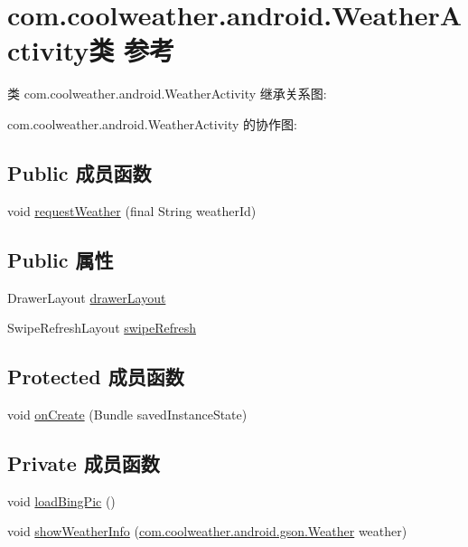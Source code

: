 \hypertarget{classcom_1_1coolweather_1_1android_1_1_weather_activity}{}\section{com.\+coolweather.\+android.\+Weather\+Activity类 参考}
\label{classcom_1_1coolweather_1_1android_1_1_weather_activity}


类 com.\+coolweather.\+android.\+Weather\+Activity 继承关系图\+:


com.\+coolweather.\+android.\+Weather\+Activity 的协作图\+:
\subsection*{Public 成员函数}
\begin{DoxyCompactItemize}
\item 
void \mbox{\hyperlink{classcom_1_1coolweather_1_1android_1_1_weather_activity_ac4d54d2108392f5e70a17eb945aef934}{request\+Weather}} (final String weather\+Id)
\end{DoxyCompactItemize}
\subsection*{Public 属性}
\begin{DoxyCompactItemize}
\item 
Drawer\+Layout \mbox{\hyperlink{classcom_1_1coolweather_1_1android_1_1_weather_activity_ae2818226e67204c76751063a0127e0d4}{drawer\+Layout}}
\item 
Swipe\+Refresh\+Layout \mbox{\hyperlink{classcom_1_1coolweather_1_1android_1_1_weather_activity_abae82d46715e9da68858482bfcae57cc}{swipe\+Refresh}}
\end{DoxyCompactItemize}
\subsection*{Protected 成员函数}
\begin{DoxyCompactItemize}
\item 
void \mbox{\hyperlink{classcom_1_1coolweather_1_1android_1_1_weather_activity_a1da84b644f79936f76652e4d2491d37e}{on\+Create}} (Bundle saved\+Instance\+State)
\end{DoxyCompactItemize}
\subsection*{Private 成员函数}
\begin{DoxyCompactItemize}
\item 
void \mbox{\hyperlink{classcom_1_1coolweather_1_1android_1_1_weather_activity_a6d725e96ad0b093549ec881d3ec760d8}{load\+Bing\+Pic}} ()
\item 
void \mbox{\hyperlink{classcom_1_1coolweather_1_1android_1_1_weather_activity_abb54e265b2c45384b36a44b4e6ef4ab7}{show\+Weather\+Info}} (\mbox{\hyperlink{classcom_1_1coolweather_1_1android_1_1gson_1_1_weather}{com.\+coolweather.\+android.\+gson.\+Weather}} weather)
\end{DoxyCompactItemize}
